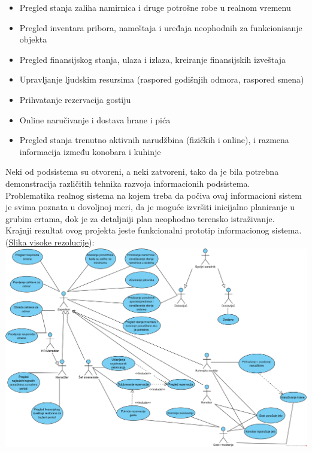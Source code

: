 \documentclass{article}
\begin{document}
\begin{itemize}
\item Pregled stanja zaliha namirnica i druge potrošne robe u realnom vremenu
\item Pregled inventara pribora, nameštaja i uređaja neophodnih za funkcionisanje objekta
\item Pregled finansijskog stanja, ulaza i izlaza, kreiranje finansijskih izveštaja
\item Upravljanje ljudskim resursima (raspored godišnjih odmora, raspored smena)
\item Prihvatanje rezervacija gostiju
\item Online naručivanje i dostava hrane i pića
\item Pregled stanja trenutno aktivnih narudžbina (fizičkih i online), i razmena informacija između konobara i kuhinje
\end{itemize}

Neki od podsistema su otvoreni, a neki zatvoreni, tako da je bila potrebna demonstracija različitih tehnika razvoja
informacionih podsistema.\\

Problematika realnog sistema na kojem treba da počiva ovaj informacioni sistem je svima poznata u dovoljnoj meri, da je moguće izvršiti inicijalno planiranje u grubim crtama, dok je za detaljniji plan neophodno terensko istraživanje.\\

Krajnji rezultat ovog projekta jeste funkcionalni prototip informacionog sistema. (\href{https://raw.githubusercontent.com/bozidarrr/NajmanjiProblem/master/FinalniDokument/SU_0_grupni.png}{Slika visoke rezolucije}):\\

\includegraphics[width=\textwidth]{SU_0_grupni.png}
\pagebreak
\end{document}
